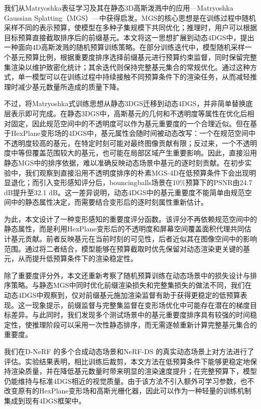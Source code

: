 \documentclass[sn-mathphys]{sn-jnl}
\begin{document}
我们从Matryoshka表征学习\cite{kusupati2022matryoshka}及其在静态3D高斯泼溅中的应用---Matryoshka Gaussian Splatting（MGS）\cite{guo2026matryoshkagaussiansplatting}---中获得启发。MGS的核心思想是在训练过程中随机采样不同的表示预算，使模型在多种子集规模下共同优化；推理时，用户可以根据目标预算直接截取排序后的前缀基元。本文将这一思想扩展到动态4DGS中，提出一种面向4D高斯泼溅的随机预算训练策略。在部分训练迭代中，模型随机采样一个基元预算比例，根据重要度排序选择前缀基元进行预算约束监督，同时保留完整集渲染以维护致密化统计；其余迭代则保持完整基元集合的常规优化。通过这种方式，单一模型可以在训练过程中持续接触不同预算条件下的渲染任务，从而减轻推理时减少基元数量所造成的质量下降。

不过，将Matryoshka式训练思想从静态3DGS迁移到动态4DGS，并非简单替换底层表示即可完成。在静态3DGS中，高斯基元的几何和不透明度等属性在优化后相对固定，因此规范空间中的不透明度可以作为基元重要度的一个合理近似。但在基于HexPlane变形场的4DGS中，基元属性会随时间被动态改写：一个在规范空间中不透明度较高的基元，在特定时刻可能对最终图像贡献有限；反过来，一个不透明度中等但覆盖范围较大的基元，也可能在局部区域产生重要影响。因此，直接沿用静态MGS中的排序依据，难以准确反映动态场景中基元的逐时刻贡献。在初步实验中，我们观察到直接沿用不透明度排序的朴素MGS-4D在低预算条件下会出现明显退化；而引入变形感知评分后，bouncingballs场景在10\%预算下的PSNR由24.7 dB提升至32.1 dB。这一差异说明，动态4DGS中的基元重要度不能简单由规范空间中的静态属性决定，而需要结合变形后的逐时刻属性重新估计。

为此，本文设计了一种变形感知的重要度评分函数。该评分不再依赖规范空间中的静态属性，而是利用HexPlane变形后的不透明度和屏幕空间覆盖面积代理共同估计基元贡献。前者反映基元在当前时刻的可见性，后者近似其在图像空间中的影响范围。通过将二者结合，模型能够在预算截取时优先保留对动态渲染更关键的基元，从而提升低预算条件下的渲染稳定性。

除了重要度评分外，本文还重新考察了随机预算训练在动态场景中的损失设计与排序策略。与静态MGS中同时优化前缀渲染损失和完整集损失的做法不同，我们在动态4DGS中观察到，仅对前缀基元施加渲染监督有助于获得更稳定的低预算表现。这一现象提示，前缀监督与完整集监督在变形场优化中可能存在潜在的梯度目标差异。与此同时，我们发现多个测试场景中的基元重要度排序具有较强的时间稳定性，使推理阶段可以采用一次性静态排序，而无需逐帧重新计算完整基元集合的重要度。

我们在D-NeRF \cite{pumarola2021dnerf} 的多个合成动态场景和NeRF-DS \cite{cai2022nerfds} 的真实动态场景上对方法进行了评估。实验结果表明，相比训练后裁剪，本文方法在低预算条件下能够更稳定地保持渲染质量，并在降低基元数量时带来明显的渲染速度提升；在完整预算下，模型仍能维持与标准4DGS相近的视觉质量。由于该方法不引入额外可学习参数，也不改变原有的HexPlane变形场和高斯光栅化器，因此可以作为一种轻量的训练机制集成到现有4DGS框架中。
\end{document}
